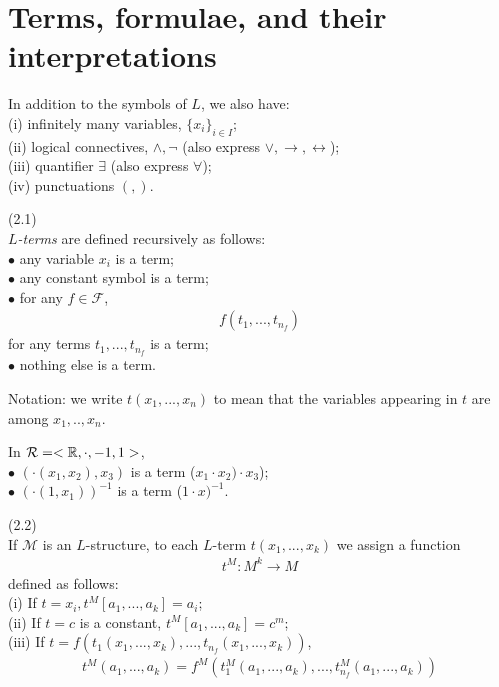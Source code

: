 \documentclass[a4paper]{article}
\begin{document}
\section{Terms, formulae, and their interpretations}
In addition to the symbols of $L$, we also have:\\
(i) infinitely many variables, $\{x_i\}_{i \in I}$;\\
(ii) logical connectives, $\wedge,\neg$ (also express $\vee, \to, \leftrightarrow$);\\
(iii) quantifier $\exists$ (also express $\forall$);\\
(iv) punctuations $(,)$.

\begin{defi} (2.1) \\
\emph{$L$-terms} are defined recursively as follows:\\
$\bullet$ any variable $x_i$ is a term;\\
$\bullet$ any constant symbol is a term;\\
$\bullet$ for any $f \in \mathcal{F}$, 
\begin{equation*}
\begin{aligned}
f(t_1,...,t_{n_f})
\end{aligned}
\end{equation*}
for any terms $t_1,...,t_{n_f}$ is a term;\\
$\bullet$ nothing else is a term.
\end{defi}

Notation: we write $t(x_1,...,x_n)$ to mean that the variables appearing in $t$ are among $x_1,..,x_n$.

\begin{eg}
In $\mathcal{R} = <\mathbb{R},\cdot,-1,1>$,\\
$\bullet$ $(\cdot (x_1,x_2),x_3)$ is a term ($x_1 \cdot x_2) \cdot x_3$);\\
$\bullet$ $(\cdot (1,x_1))^{-1}$ is a term ($1 \cdot x)^{-1}$.
\end{eg}

\begin{defi} (2.2)\\
If $\mathcal{M}$ is an $L$-structure, to each $L$-term $t(x_1,...,x_k)$ we assign a function
\begin{equation*}
\begin{aligned}
t^M: M^k \to M
\end{aligned}
\end{equation*}
defined as follows:\\
(i) If $t = x_i, t^M [a_1,...,a_k] = a_i$;\\
(ii) If $t=c$ is a constant, $t^M [a_1,...,a_k] = c^m$;\\
(iii) If $t=f(t_1(x_1,...,x_k),...,t_{n_f}(x_1,...,x_k))$, 
\begin{equation*}
\begin{aligned}
t^M (a_1,...,a_k) = f^M(t_1^M(a_1,...,a_k),...,t_{n_f}^M(a_1,...,a_k))
\end{aligned}
\end{equation*}
\end{defi} 
\end{document}
